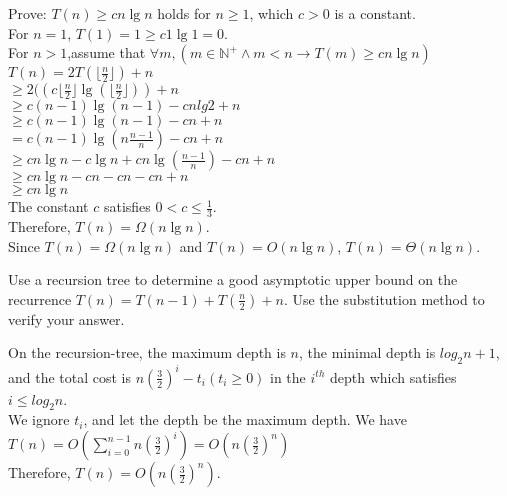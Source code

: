 \documentclass[a4paper, justified]{tufte-handout}
\begin{document}
\begin{solution}
Prove: $T(n)\geq cn\lg n$ holds for $n\geq 1$,  which $c>0$ is a constant.\\
For $n=1$, $T(1)=1\geq c1\lg 1=0$.\\
 For $n>1$,assume that $\forall m,(m\in\mathbb{N}^{+}\land m<n\to T(m)\geq cn\lg n)$\\
 $T(n)=2 T(\lfloor \frac{n}{2}\rfloor)+n$\\
 \hspace*{2.5em}$\geq 2((c \lfloor \frac{n}{2} \rfloor \lg(\lfloor \frac{n}{2}\rfloor))+n$\\
\hspace*{2.5em}$\geq c(n-1)\lg(n-1)-cnlg2+n$\\
\hspace*{2.5em}$\geq c(n-1)\lg(n-1)-cn+n$\\
\hspace*{2.5em}$= c(n-1)\lg(n\frac{n-1}{n})-cn+n$\\
\hspace*{2.5em}$\geq cn\lg n -c\lg n+cn\lg (\frac{n-1}{n})-cn+n$\\
\hspace*{2.5em}$\geq cn\lg n -cn-cn-cn+n$\\
\hspace*{2.5em}$\geq cn\lg n$\\
The constant $c$ satisfies $0<c\leq\frac{1}{3}$.\\
Therefore, $T(n)=\Omega(n \lg n)$.\\
Since $T(n)=\Omega(n \lg n)$ and $T(n)=O(n\lg n)$, $T(n)=\Theta(n \lg n)$.
\end{solution}

\begin{problem}[TC 4.4-5]
Use a recursion tree to determine a good asymptotic upper bound on the recurrence $T(n)=T(n-1)+T(\frac{n}{2})+n$. Use the substitution method to verify your answer.
\end{problem}

\begin{solution}
On the  recursion-tree, the maximum depth is  $n$, the minimal depth is $log_2{n}+1$, and the total cost is  $n(\frac{3}{2})^i-t_i(t_i\geq 0)$  in the $i^{th}$ depth which satisfies $i\leq log_2{n}$.\\ 
We ignore $t_i$, and let the depth be the maximum depth. We have\\
$T(n)=O(\sum\limits_{i=0}^{n-1}n(\frac{3}{2})^i)=O(n(\frac{3}{2})^n)$\\
Therefore, $T(n)=O(n(\frac{3}{2})^n)$.
\end{solution}
\end{document}
